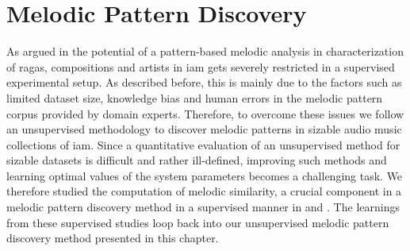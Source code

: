 

\section{Melodic Pattern Discovery}
\label{sec:patterns_melodic_pattern_discovery}

As argued in  the potential of a pattern-based melodic analysis in characterization of \glspl{raga}, compositions and artists in \gls{iam} gets severely restricted in a supervised experimental setup. As described before, this is mainly due to the factors such as limited dataset size, knowledge bias and human errors in the melodic pattern corpus provided by domain experts. Therefore, to overcome these issues we follow an unsupervised methodology to discover melodic patterns in sizable audio music collections of \gls{iam}. Since a quantitative evaluation of an unsupervised method for sizable datasets is difficult and rather ill-defined, improving such methods and learning optimal values of the system parameters becomes a challenging task. We therefore studied the computation of melodic similarity, a crucial component in a melodic pattern discovery method in a supervised manner in  and . The learnings from these supervised studies loop back into our unsupervised melodic pattern discovery method presented in this chapter. 

